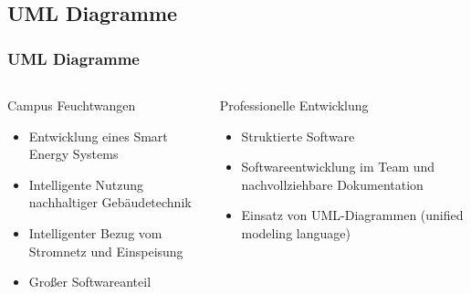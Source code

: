 \documentclass[xcolor=dvipsnames]{beamer}
\begin{document}
	
	
	
	
	\begin{frame}
		\section{UML Diagramme}
		\frametitle{UML Diagramme}
		\begin{columns}
			\begin{column}{0.50\textwidth}
				\begin{block}{Campus Feuchtwangen}
					\begin{itemize}
						\item Entwicklung eines Smart Energy Systems
						\item Intelligente Nutzung nachhaltiger Gebäudetechnik
						\item Intelligenter Bezug vom Stromnetz und Einspeisung
						\item Großer Softwareanteil
					\end{itemize}
				\end{block}
			\end{column}
			
			\begin{column}{0.50\textwidth}
				\begin{block}{Professionelle Entwicklung}
					\begin{itemize}
						\item Struktierte Software
						\item Softwareentwicklung im Team und nachvollziehbare Dokumentation
						\item Einsatz von UML-Diagrammen (unified modeling language)
					\end{itemize}
				\end{block}
			\end{column}
		\end{columns}
		
	\end{frame}
	
	
	
\end{document}
